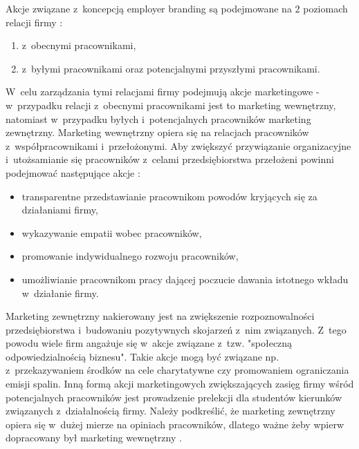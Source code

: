 Akcje związane z~koncepcją employer branding są podejmowane na 2 poziomach relacji firmy \cite{spychala-2019}:
\begin{enumerate}
    \item z~obecnymi pracownikami,
    \item z~byłymi pracownikami oraz potencjalnymi przyszłymi pracownikami.
\end{enumerate}

W~celu zarządzania tymi relacjami firmy podejmują akcje marketingowe - w~przypadku relacji z~obecnymi pracownikami jest to marketing wewnętrzny,
natomiast w~przypadku byłych i~potencjalnych pracowników marketing zewnętrzny.
Marketing wewnętrzny opiera się na relacjach pracowników z~współpracownikami i~przełożonymi.
Aby zwiększyć przywiązanie organizacyjne i~utożsamianie się pracowników z~celami przedsiębiorstwa przełożeni powinni podejmować następujące akcje \cite{spychala-2019}:
\begin{itemize}
    \item transparentne przedstawianie pracownikom powodów kryjących się za działaniami firmy,
    \item wykazywanie empatii wobec pracowników,
    \item promowanie indywidualnego rozwoju pracowników,
    \item umożliwianie pracownikom pracy dającej poczucie dawania istotnego wkładu w~działanie firmy.
\end{itemize}

Marketing zewnętrzny nakierowany jest na zwiększenie rozpoznowalności przedsiębiorstwa i~budowaniu pozytywnych skojarzeń z~nim związanych.
Z~tego powodu wiele firm angażuje się w~akcje związane z~tzw. "społeczną odpowiedzialnością biznesu".
Takie akcje mogą być związane np. z~przekazywaniem środków na cele charytatywne czy promowaniem ograniczania emisji spalin.
Inną formą akcji marketingowych zwiększających zasięg firmy wśród potencjalnych pracowników jest prowadzenie prelekcji dla studentów kierunków związanych z~działalnością firmy.
Należy podkreślić, że marketing zewnętrzny opiera się w~dużej mierze na opiniach pracowników, dlatego ważne żeby wpierw dopracowany był marketing wewnętrzny \cite{spychala-2019}.

